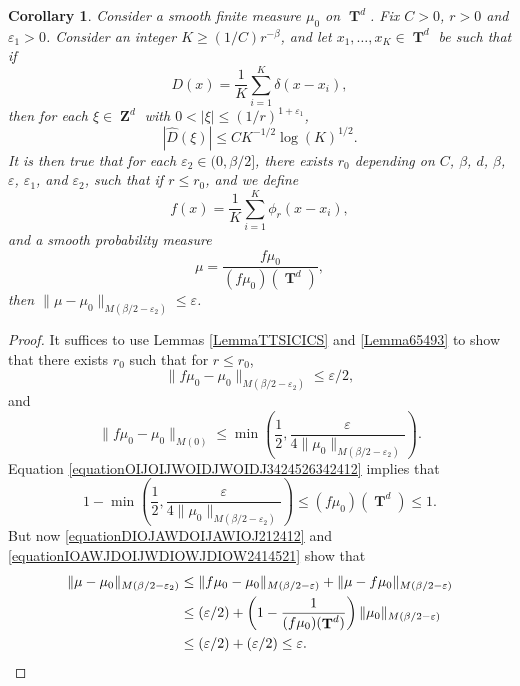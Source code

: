 \documentclass[12pt,reqno]{article}
\numberwithin{equation}{section}
\DeclareMathOperator{\ZZ}{\mathbf{Z}}
\DeclareMathOperator{\TT}{\mathbf{T}}
\newtheorem{corollary}{Corollary}
\begin{document}
\begin{corollary} \label{lemmaIOJDD23124}
    Consider a smooth finite measure $\mu_0$ on $\TT^d$. Fix $C > 0$, $r > 0$ and $\varepsilon_1 > 0$. Consider an integer $K \geq (1/C) r^{-\beta}$, and let $x_1,\dots,x_K \in \TT^d$ be such that if
    \[ D(x) = \frac{1}{K} \sum_{i = 1}^K \delta(x - x_i), \]
    then for each $\xi \in \ZZ^d$ with $0 < |\xi| \leq (1/r)^{1+\varepsilon_1}$,
    \begin{equation} \label{equationBBBBODDUH}
        |\widehat{D}(\xi)| \leq C K^{-1/2} \log(K)^{1/2}.
    \end{equation}
    It is then true that for each $\varepsilon_2 \in (0,\beta/2]$, there exists $r_0$ depending on $C$, $\beta$, $d$, $\beta$, $\varepsilon$, $\varepsilon_1$, and $\varepsilon_2$, such that if $r \leq r_0$, and we define
    \[ f(x) = \frac{1}{K} \sum_{i = 1}^K \phi_{r}(x - x_i), \]
    and a smooth probability measure
    \[ \mu = \frac{f \mu_0}{(f \mu_0)(\TT^d)}, \]
    then $\| \mu - \mu_0 \|_{M(\beta/2 - \varepsilon_2)} \leq \varepsilon$.
\end{corollary}
\begin{proof}
    It suffices to use Lemmas \ref{LemmaTTSICICS} and \ref{Lemma65493} to show that there exists $r_0$ such that for $r \leq r_0$,
    \begin{equation} \label{equationDIOJAWDOIJAWIOJ212412}
        \| f \mu_0 - \mu_0 \|_{M(\beta/2 - \varepsilon_2)} \leq \varepsilon/2,
    \end{equation}
    and
    \begin{equation} \label{equationOIJOIJWOIDJWOIDJ3424526342412}
        \| f \mu_0 - \mu_0 \|_{M(0)} \leq \min \left( \frac{1}{2}, \frac{\varepsilon}{4 \| \mu_0 \|_{M(\beta/2 - \varepsilon_2)}} \right).
    \end{equation}
    Equation \eqref{equationOIJOIJWOIDJWOIDJ3424526342412} implies that
    \begin{equation} \label{equationIOAWJDOIJWDIOWJDIOW2414521}
        1 - \min \left( \frac{1}{2}, \frac{\varepsilon}{4 \| \mu_0 \|_{M(\beta/2 - \varepsilon_2)}} \right) \leq (f\mu_0)(\TT^d) \leq 1.
    \end{equation}
    But now \eqref{equationDIOJAWDOIJAWIOJ212412} and \eqref{equationIOAWJDOIJWDIOWJDIOW2414521} show that
    \begin{align*}
        \| \mu - \mu_0 \|_{M(\beta/2 - \varepsilon_2)} &\leq \| f \mu_0 - \mu_0 \|_{M(\beta/2 - \varepsilon)} + \| \mu - f \mu_0 \|_{M(\beta/2 - \varepsilon)}\\
        &\leq (\varepsilon/2) + \left( 1 - \frac{1}{(f \mu_0)(\TT^d)} \right) \| \mu_0 \|_{M(\beta/2 - \varepsilon)}\\
        &\leq (\varepsilon/2) + (\varepsilon/2) \leq \varepsilon. \qedhere
    \end{align*}
\end{proof}
\end{document}
